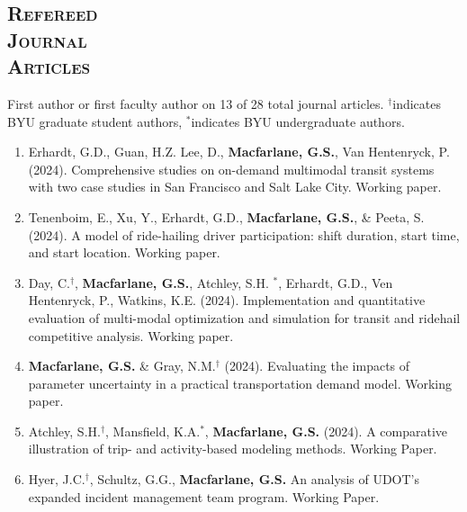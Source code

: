 \documentclass[margin,line]{res}
\newif\ifdetail
\newcounter{enuminitialize}
\newenvironment{myenum}[1][]
{%
 \setcounter{enuminitialize}{#1}
 \addtocounter{enuminitialize}{2}
 \begin{enumerate}[left= 4pt, itemsep=8pt, start=\value{enuminitialize}, label=\arabic*\addtocounter{enumi}{-2}]
}
{%
 \end{enumerate}
}
\newcommand{\secfont}{\scshape }
\begin{document}
\begin{resume}

\section{\secfont Refereed \\ Journal\\ Articles}
First author or first faculty author on 13 of 28 total journal articles.
$^\dagger$indicates BYU graduate student authors, $^*$indicates BYU undergraduate authors.
\ifdetail 
Paper 1 came from my undergraduate work, papers 2 through 6 were from my doctoral research, and
papers 7 onward represent work completed during my time on the faculty at BYU. Number of citations
are from Google Scholar as of October 2024. Work published since my third year review appears in blue.\fi
\vspace{.3cm}

\begin{myenum}[28]


  \item Erhardt, G.D., Guan, H.Z. Lee, D., \textbf{Macfarlane, G.S.}, Van Hentenryck,
  P. (2024). Comprehensive studies on on-demand multimodal transit systems with
  two case studies in San Francisco and Salt Lake City. Working paper.

  \item Tenenboim, E., Xu, Y., Erhardt, G.D.,  \textbf{Macfarlane, G.S.}, \& Peeta, S.
  (2024).  A model of ride-hailing driver participation: shift duration, start
  time, and start location. Working paper.

  \item Day, C.$^\dagger$, \textbf{Macfarlane, G.S.}, Atchley, S.H. $^*$, Erhardt, G.D., Ven Hentenryck, P., Watkins, K.E. (2024). 
  Implementation and quantitative evaluation of multi-modal optimization and simulation for transit and ridehail competitive analysis. 
  Working paper.

  \item \textbf{Macfarlane, G.S.} \& Gray, N.M.$^\dagger$ (2024). 
  Evaluating the impacts of parameter uncertainty in a practical transportation demand model. Working paper.

  \item Atchley, S.H.$^\dagger$, Mansfield, K.A.$^*$, \textbf{Macfarlane, G.S.}
  (2024). A comparative illustration of trip- and activity-based modeling
  methods. Working Paper.

  \item Hyer, J.C.$^\dagger$, Schultz, G.G., \textbf{Macfarlane, G.S.} An analysis
  of UDOT’s expanded incident management team program. Working Paper.


\end{myenum}
\end{resume}
\end{document}
